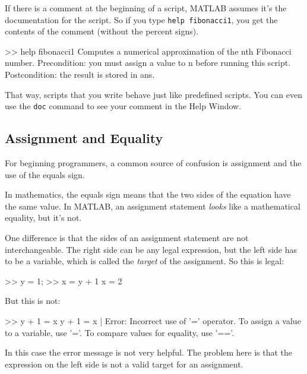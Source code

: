 
If there is a comment at the beginning of a script, MATLAB assumes
it's the documentation for the script. So if you type \lstinline{help fibonacci1}, you get the contents of the comment (without the percent
signs).

\begin{code}
>> help fibonacci1
  Computes a numerical approximation of the nth Fibonacci number.
  Precondition: you must assign a value to n before running this script.
  Postcondition: the result is stored in ans.
\end{code}

That way, scripts that you write behave just like predefined scripts.
You can even use the \lstinline{doc} command to see your comment in the
Help Window.


\subsection{Assignment and Equality}

For beginning programmers, a common source of confusion is assignment and the use of the equals sign.


In mathematics, the equals sign means that the two sides of the
equation have the same value.
In MATLAB, an assignment statement \emph{looks} like a mathematical equality, but it's not.

One difference is that the sides of an assignment statement are not
interchangeable.  The right side can be any legal expression, but
the left side has to be a variable, which is called the
\emph{target} of the assignment.  So this is legal:

\begin{code}
>> y = 1;
>> x = y + 1
x = 2
\end{code}

But this is not:

\begin{code}
>> y + 1 = x
 y + 1 = x
       |
Error: Incorrect use of '=' operator.
To assign a value to a variable, use '='.
To compare values for equality, use '=='.
\end{code}

In this case the error message is not very helpful.  The problem here is that the expression on the left side is not a valid target for an assignment.

